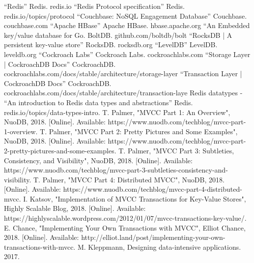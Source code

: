 \documentclass[conference]{IEEEtran}
\begin{document}
    \begin{thebibliography}{00}
     “Redis” Redis. redis.io
     “Redis Protocol specification” Redis. redis.io/topics/protocol
     “Couchbase: NoSQL Engagement Database” Couchbase. couchbase.com
     “Apache HBase” Apache HBase. hbase.apache.org
     “An Embedded key/value database for Go. BoltDB. github.com/boltdb/bolt
     “RocksDB | A persistent key-value store” RocksDB. rocksdb.org
     “LevelDB” LevelDB. leveldb.org
     “Cockroach Labs” Cockroach Labs. cockroachlabs.com
     “Storage Layer | CockroachDB Docs” CockroachDB. cockroachlabs.com/docs/stable/architecture/storage-layer
     “Transaction Layer | CockroachDB Docs” CockroachDB. cockroachlabs.com/docs/stable/architecture/transaction-laye
     Redis datatypes - “An introduction to Redis data types and abstractions” Redis. redis.io/topics/data-types-intro.
     T. Palmer, "MVCC Part 1: An Overview", NuoDB, 2018. [Online]. Available: https://www.nuodb.com/techblog/mvcc-part-1-overview.
     T. Palmer, "MVCC Part 2: Pretty Pictures and Some Examples", NuoDB, 2018. [Online]. Available: https://www.nuodb.com/techblog/mvcc-part-2-pretty-pictures-and-some-examples.
     T. Palmer, "MVCC Part 3: Subtleties, Consistency, and Visibility", NuoDB, 2018. [Online]. Available: https://www.nuodb.com/techblog/mvcc-part-3-subtleties-consistency-and-visibility.
     T. Palmer, "MVCC Part 4: Distributed MVCC", NuoDB, 2018. [Online]. Available: https://www.nuodb.com/techblog/mvcc-part-4-distributed-mvcc.
     I. Katsov, "Implementation of MVCC Transactions for Key-Value Stores", Highly Scalable Blog, 2018. [Online]. Available: https://highlyscalable.wordpress.com/2012/01/07/mvcc-transactions-key-value/.
     E. Chance, "Implementing Your Own Transactions with MVCC", Elliot Chance, 2018. [Online]. Available: http://elliot.land/post/implementing-your-own-transactions-with-mvcc.
     M. Kleppmann, Designing data-intensive applications. 2017.
    \end{thebibliography}
    
\end{document}
